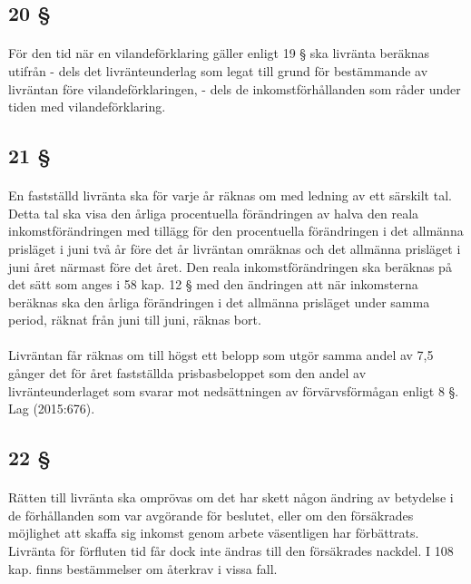 \documentclass[a4paper,notitlepage,openany,10pt]{book}
\begin{document}
\subsection*{20 §}
\paragraph*{}
För den tid när en vilandeförklaring gäller enligt 19 § ska livränta beräknas utifrån
\newline - dels det livränteunderlag som legat till grund för bestämmande av livräntan före vilandeförklaringen,
\newline - dels de inkomstförhållanden som råder under tiden med vilandeförklaring.
\subsection*{21 §}
\paragraph*{}
En fastställd livränta ska för varje år räknas om med ledning av ett särskilt tal. Detta tal ska visa den årliga procentuella förändringen av halva den reala inkomstförändringen med tillägg för den procentuella förändringen i det allmänna prisläget i juni två år före det år livräntan omräknas och det allmänna prisläget i juni året närmast före det året. Den reala inkomstförändringen ska beräknas på det sätt som anges i 58 kap. 12 § med den ändringen att när inkomsterna beräknas ska den årliga förändringen i det allmänna prisläget under samma period, räknat från juni till juni, räknas bort.
\paragraph*{}
Livräntan får räknas om till högst ett belopp som utgör samma andel av 7,5 gånger det för året fastställda prisbasbeloppet som den andel av livränteunderlaget som svarar mot nedsättningen av förvärvsförmågan enligt 8 §.
Lag (2015:676).
\subsection*{22 §}
\paragraph*{}
Rätten till livränta ska omprövas om det har skett någon ändring av betydelse i de förhållanden som var avgörande för beslutet, eller om den försäkrades möjlighet att skaffa sig inkomst genom arbete väsentligen har förbättrats. Livränta för förfluten tid får dock inte ändras till den försäkrades nackdel. I 108 kap. finns bestämmelser om återkrav i vissa fall.
\end{document}
